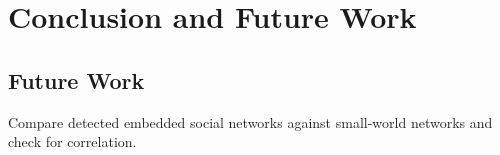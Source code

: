 \chapter{Conclusion and Future Work}\label{C:us}

\section{Future Work}

Compare detected embedded social networks against small-world networks and check for correlation. 
